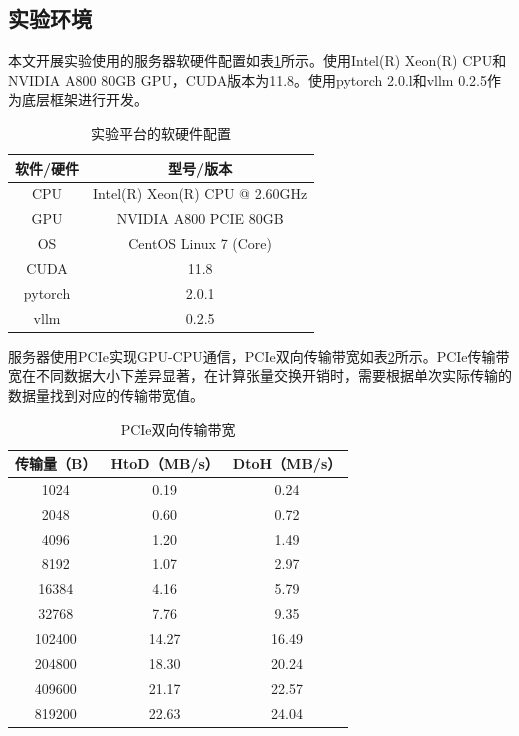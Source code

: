 \documentclass[a4paper, nosysfonts]{hpcchina}
\begin{document}
\subsection{实验环境}
本文开展实验使用的服务器软硬件配置如表\ref{实验平台的软硬件配置}所示。使用Intel(R) Xeon(R) CPU和NVIDIA A800 80GB GPU，CUDA版本为11.8。使用pytorch 2.0.l和vllm 0.2.5作为底层框架进行开发。
\begin{table}[H]
  \centering
  \caption{实验平台的软硬件配置}
  \label{实验平台的软硬件配置}
  \begin{tabular}{|c|c|}
    \hline
    \textbf{软件/硬件} & \textbf{型号/版本} \\ \hline
    CPU & Intel(R) Xeon(R) CPU @ 2.60GHz  \\ \hline
    GPU & NVIDIA A800 PCIE 80GB \\ \hline
    OS & CentOS Linux 7 (Core) \\ \hline
    CUDA & 11.8 \\ \hline
    pytorch & 2.0.1 \\ \hline
    vllm & 0.2.5 \\ \hline
  \end{tabular}
\end{table}
服务器使用PCIe实现GPU-CPU通信，PCIe双向传输带宽如表\ref{PCIe双向传输带宽}所示。PCIe传输带宽在不同数据大小下差异显著，在计算张量交换开销时，需要根据单次实际传输的数据量找到对应的传输带宽值。
\begin{table}[H]
  \centering
  \caption{PCIe双向传输带宽}
  \label{PCIe双向传输带宽}
  \begin{tabular}{|c|c|c|}
    \hline
    \textbf{传输量（B）} & \textbf{HtoD（MB/s）} & \textbf{DtoH（MB/s）} \\ \hline
    1024 & 0.19 & 0.24 \\ \hline
    2048 & 0.60 & 0.72 \\ \hline
    4096 & 1.20 & 1.49 \\ \hline
    8192 & 1.07 & 2.97 \\ \hline
    16384 & 4.16 & 5.79 \\ \hline
    32768 & 7.76 & 9.35 \\ \hline
    102400 & 14.27 & 16.49 \\ \hline
    204800 & 18.30 & 20.24 \\ \hline
    409600 & 21.17 & 22.57 \\ \hline
    819200 & 22.63 & 24.04 \\ \hline
  \end{tabular}
\end{table}
\end{document}
